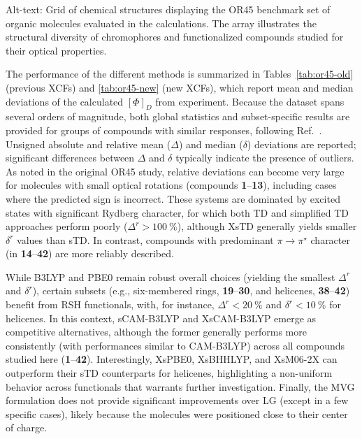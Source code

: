 \documentclass[%
 aip,
 amsmath,amssymb,
preprint,%
]{revtex4-2}
\begin{document}
\noindent Alt-text: Grid of chemical structures displaying the OR45 benchmark set of organic molecules evaluated in the calculations. The array illustrates the structural diversity of chromophores and functionalized compounds studied for their optical properties.

\clearpage
The performance of the different methods is summarized in Tables~\ref{tab:or45-old} (previous XCFs) and \ref{tab:or45-new} (new XCFs), which report mean and median deviations of the calculated $[\Phi]_D$ from experiment.  
Because the dataset spans several orders of magnitude, both global statistics and subset-specific results are provided for groups of compounds with similar responses, following Ref.~.  
Unsigned absolute and relative mean ($\Delta$) and median ($\delta$) deviations are reported; significant differences between $\Delta$ and $\delta$ typically indicate the presence of outliers.  
As noted in the original OR45 study,\cite{srebroOpticalRotationCalculated2011} relative deviations can become very large for molecules with small optical rotations (compounds \textbf{1}--\textbf{13}), including cases where the predicted sign is incorrect.  
These systems are dominated by excited states with significant Rydberg character, for which both TD and simplified TD approaches perform poorly ($\Delta^r > \SI{100}{\percent}$), although XsTD generally yields smaller $\delta^r$ values than sTD.  
In contrast, compounds with predominant $\pi \to \pi^\star$ character (in \textbf{14}--\textbf{42}) are more reliably described.  

While B3LYP and PBE0 remain robust overall choices (yielding the smallest $\Delta^r$ and $\delta^r$), certain subsets (e.g., six-membered rings, \textbf{19}--\textbf{30}, and helicenes, \textbf{38}--\textbf{42}) benefit from RSH functionals, with, for instance, $\Delta^r < \SI{20}{\percent}$ and $\delta^r < \SI{10}{\percent}$ for helicenes.  
In this context, sCAM-B3LYP and XsCAM-B3LYP emerge as competitive alternatives, although the former generally performs more consistently (with performances similar to CAM-B3LYP) across all compounds studied here (\textbf{1}--\textbf{42}).  
Interestingly, XsPBE0, XsBHHLYP, and XsM06-2X can outperform their sTD counterparts for helicenes, highlighting a non-uniform behavior across functionals that warrants further investigation.  
Finally, the MVG formulation does not provide significant improvements over LG (except in a few specific cases), likely because the molecules were positioned close to their center of charge.
\end{document}
